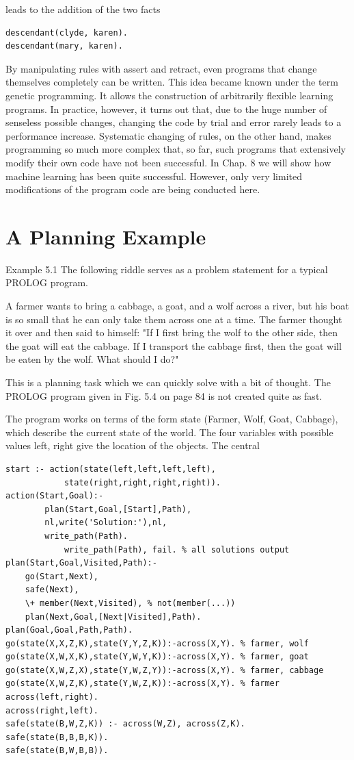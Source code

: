 \documentclass[10pt]{book}
\begin{document}
leads to the addition of the two facts

\begin{verbatim}
descendant(clyde, karen).
descendant(mary, karen).
\end{verbatim}

By manipulating rules with assert and retract, even programs that change themselves completely can be written. This idea became known under the term genetic programming. It allows the construction of arbitrarily flexible learning programs. In practice, however, it turns out that, due to the huge number of senseless possible changes, changing the code by trial and error rarely leads to a performance increase. Systematic changing of rules, on the other hand, makes programming so much more complex that, so far, such programs that extensively modify their own code have not been successful. In Chap. 8 we will show how machine learning has been quite successful. However, only very limited modifications of the program code are being conducted here.

\section{A Planning Example}
Example 5.1 The following riddle serves as a problem statement for a typical PROLOG program.

A farmer wants to bring a cabbage, a goat, and a wolf across a river, but his boat is so small that he can only take them across one at a time. The farmer thought it over and then said to himself: "If I first bring the wolf to the other side, then the goat will eat the cabbage. If I transport the cabbage first, then the goat will be eaten by the wolf. What should I do?"

This is a planning task which we can quickly solve with a bit of thought. The PROLOG program given in Fig. 5.4 on page 84 is not created quite as fast.

The program works on terms of the form state (Farmer, Wolf, Goat, Cabbage), which describe the current state of the world. The four variables with possible values left, right give the location of the objects. The central

\begin{verbatim}
start :- action(state(left,left,left,left),
            state(right,right,right,right)).
action(Start,Goal):-
        plan(Start,Goal,[Start],Path),
        nl,write('Solution:'),nl,
        write_path(Path).
            write_path(Path), fail. % all solutions output
plan(Start,Goal,Visited,Path):-
    go(Start,Next),
    safe(Next),
    \+ member(Next,Visited), % not(member(...))
    plan(Next,Goal,[Next|Visited],Path).
plan(Goal,Goal,Path,Path).
go(state(X,X,Z,K),state(Y,Y,Z,K)):-across(X,Y). % farmer, wolf
go(state(X,W,X,K),state(Y,W,Y,K)):-across(X,Y). % farmer, goat
go(state(X,W,Z,X),state(Y,W,Z,Y)):-across(X,Y). % farmer, cabbage
go(state(X,W,Z,K),state(Y,W,Z,K)):-across(X,Y). % farmer
across(left,right).
across(right,left).
safe(state(B,W,Z,K)) :- across(W,Z), across(Z,K).
safe(state(B,B,B,K)).
safe(state(B,W,B,B)).
\end{verbatim}
\end{document}
